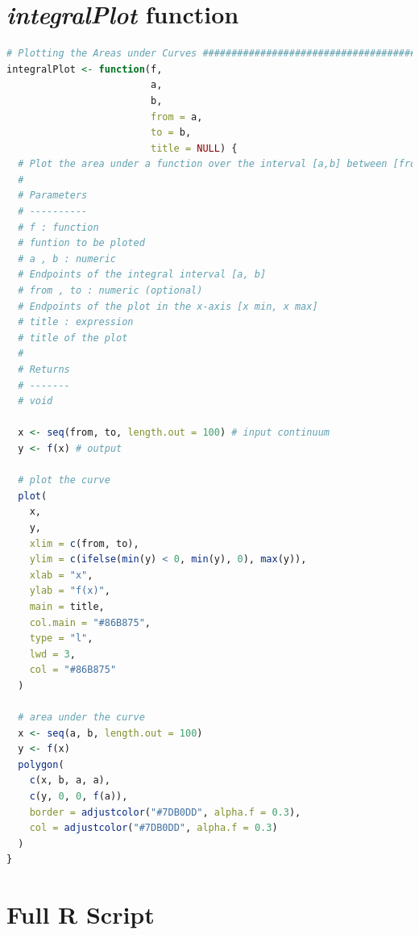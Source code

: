 \documentclass[11pt,a4paper]{article}
\begin{document}
\clearpage
\printbibliography

\appendix %

\clearpage

\section{\emph{integralPlot} function}\label{sec:appends}

\begin{lstlisting}[frame=trBL, language=R]
# Plotting the Areas under Curves ######################################
integralPlot <- function(f,
                         a,
                         b,
                         from = a,
                         to = b,
                         title = NULL) {
  # Plot the area under a function over the interval [a,b] between [from,to].
  #
  # Parameters
  # ----------
  # f : function
  # funtion to be ploted
  # a , b : numeric
  # Endpoints of the integral interval [a, b]
  # from , to : numeric (optional)
  # Endpoints of the plot in the x-axis [x min, x max]
  # title : expression
  # title of the plot
  #
  # Returns
  # -------
  # void
  
  x <- seq(from, to, length.out = 100) # input continuum
  y <- f(x) # output
  
  # plot the curve
  plot(
    x,
    y,
    xlim = c(from, to),
    ylim = c(ifelse(min(y) < 0, min(y), 0), max(y)),
    xlab = "x",
    ylab = "f(x)",
    main = title,
    col.main = "#86B875",
    type = "l",
    lwd = 3,
    col = "#86B875"
  )
  
  # area under the curve
  x <- seq(a, b, length.out = 100)
  y <- f(x)
  polygon(
    c(x, b, a, a),
    c(y, 0, 0, f(a)),
    border = adjustcolor("#7DB0DD", alpha.f = 0.3),
    col = adjustcolor("#7DB0DD", alpha.f = 0.3)
  )
}
\end{lstlisting}

\clearpage

\section{Full R Script}\label{sec:fullScript}
\end{document}
